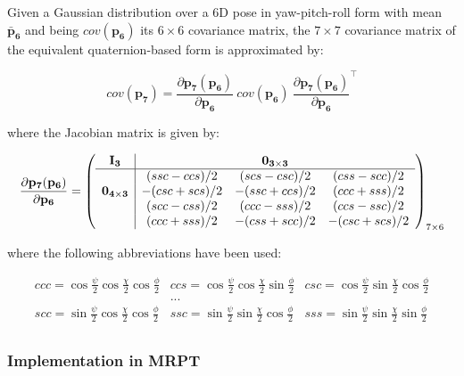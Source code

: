 \documentclass[a4paper,10pt]{report}
\begin{document}
Given a Gaussian distribution over a 6D pose in yaw-pitch-roll form with 
mean ${\mathbf{\bar{p}_6}}$ and being  $cov(\mathbf{p_6})$ its $6 \times 6$ covariance matrix, 
the $7 \times 7$ covariance matrix of the equivalent quaternion-based form 
is approximated by:

\begin{equation}
cov(\mathbf{p_7}) =
\frac{\partial \mathbf{p_7}(\mathbf{p_6}) }{\partial \mathbf{p_6}} ~ 
cov(\mathbf{p_6})  ~
\frac{\partial \mathbf{p_7}(\mathbf{p_6}) }{\partial \mathbf{p_6}}^\top 
\end{equation}

\noindent where the Jacobian matrix is given by:

\begin{equation}
\frac{\partial \mathbf{p_7}(\mathbf{p_6}) }{\partial \mathbf{p_6}} =
\left(
\begin{array}{c|cccc}
 \mathbf{I_3} & & \mathbf{0_{3\times 3}} & \\ \hline
  & (ssc-ccs)/2 & (scs-csc)/2 & (css-scc)/2 \\
 \mathbf{0_{4\times 3}}
  & -(csc+scs)/2 & -(ssc+ccs)/2 & (ccc+sss)/2 \\
  & (scc-css)/2 & (ccc-sss)/2 & (ccs-ssc)/2 \\ 
  & (ccc+sss)/2 & -(css+scc)/2 & -(csc+scs)/2 \\ 
\end{array}
\right)_{7 \times 6}
\end{equation}

\noindent where the following abbreviations have been used:

\begin{equation*}
\begin{array}{ccc}
ccc = \cos\frac{\psi}{2}\cos\frac{\chi}{2}\cos\frac{\phi}{2}  & 
ccs = \cos\frac{\psi}{2}\cos\frac{\chi}{2}\sin\frac{\phi}{2}  & 
csc = \cos\frac{\psi}{2}\sin\frac{\chi}{2}\cos\frac{\phi}{2}  \\
 & ... & \\
scc = \sin\frac{\psi}{2}\cos\frac{\chi}{2}\cos\frac{\phi}{2}  & 
ssc = \sin\frac{\psi}{2}\sin\frac{\chi}{2}\cos\frac{\phi}{2}  & 
sss = \sin\frac{\psi}{2}\sin\frac{\chi}{2}\sin\frac{\phi}{2}  \\
\end{array}
\end{equation*}



\subsubsection{Implementation in MRPT}
\end{document}
